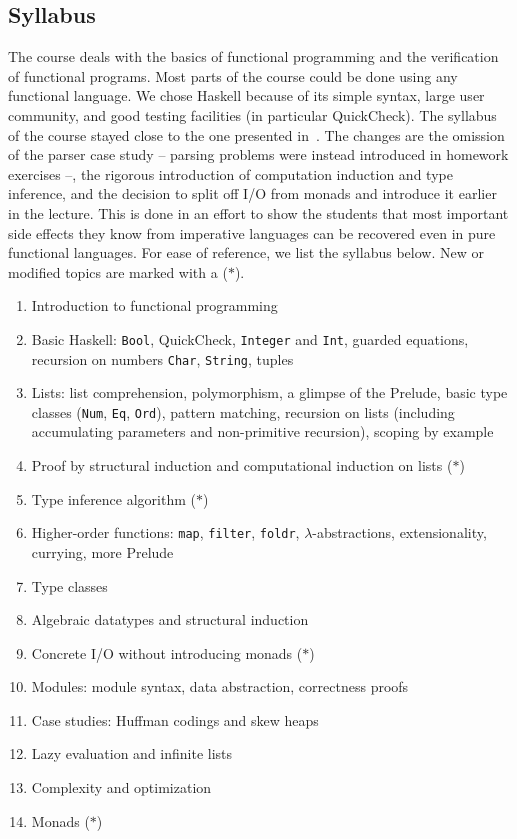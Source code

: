 \subsection{Syllabus\label{sec:syllabus}}

The course deals with the basics of functional programming and the verification of functional programs.
Most parts of the course could be done using any functional language.
We chose Haskell because of its simple syntax, large user community, and good testing facilities (in particular QuickCheck).
The syllabus of the course stayed close to the one presented in~\cite{next_1100}.
The changes are the omission of the parser case study -- parsing problems were instead introduced in homework exercises --, the rigorous introduction of computation induction and type inference, and the decision to split off I/O from monads and introduce it earlier in the lecture.
This is done in an effort to show the students that most important side effects they know from imperative languages can be recovered even in pure functional languages.
For ease of reference, we list the syllabus below.
New or modified topics are marked with a ($\ast$).

\begin{enumerate}
  \item Introduction to functional programming
  \item Basic Haskell: \texttt{Bool}, QuickCheck, \texttt{Integer} and \texttt{Int}, guarded equations, recursion on numbers \texttt{Char}, \texttt{String}, tuples
  \item Lists: list comprehension, polymorphism, a glimpse of the Prelude, basic type classes (\texttt{Num}, \texttt{Eq}, \texttt{Ord}), pattern matching, recursion on lists (including accumulating parameters and non-primitive recursion), scoping by example
  \item Proof by structural induction and computational induction on lists ($\ast$)
  \item Type inference algorithm ($\ast$)
  \item Higher-order functions: \texttt{map}, \texttt{filter}, \texttt{foldr}, $\lambda$-abstractions, extensionality, currying, more Prelude
  \item Type classes
  \item Algebraic datatypes and structural induction
  \item Concrete I/O without introducing monads ($\ast$)
  \item Modules: module syntax, data abstraction, correctness proofs
  \item Case studies: Huffman codings and skew heaps
  \item Lazy evaluation and infinite lists
  \item Complexity and optimization
  \item Monads ($\ast$)
\end{enumerate}

